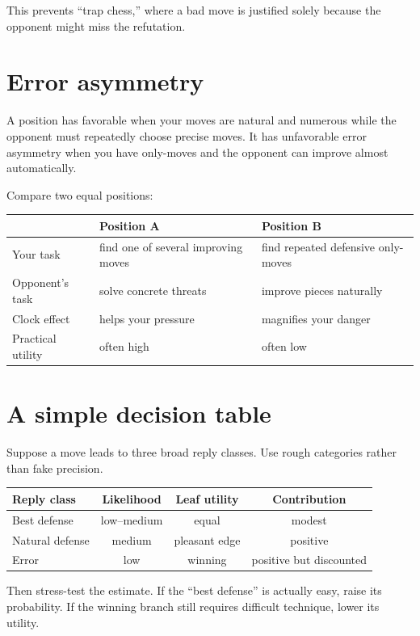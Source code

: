 This prevents ``trap chess,'' where a bad move is justified solely because the opponent might miss the refutation.

\section{Error asymmetry}
A position has favorable  when your moves are natural and numerous while the opponent must repeatedly choose precise moves. It has unfavorable error asymmetry when you have only-moves and the opponent can improve almost automatically.

Compare two equal positions:

\begin{center}
\begin{tabularx}{.92\textwidth}{p{}YY}
\toprule
& \textbf{Position A} & \textbf{Position B}\\
\midrule
Your task & find one of several improving moves & find repeated defensive only-moves\\
Opponent's task & solve concrete threats & improve pieces naturally\\
Clock effect & helps your pressure & magnifies your danger\\
Practical utility & often high & often low\\
\bottomrule
\end{tabularx}
\end{center}

\section{A simple decision table}
Suppose a move leads to three broad reply classes. Use rough categories rather than fake precision.

\begin{center}
\begin{tabular}{lccc}
\toprule
Reply class & Likelihood & Leaf utility & Contribution\\
\midrule
Best defense & low--medium & equal & modest\\
Natural defense & medium & pleasant edge & positive\\
Error & low & winning & positive but discounted\\
\bottomrule
\end{tabular}
\end{center}

Then stress-test the estimate. If the ``best defense'' is actually easy, raise its probability. If the winning branch still requires difficult technique, lower its utility.

